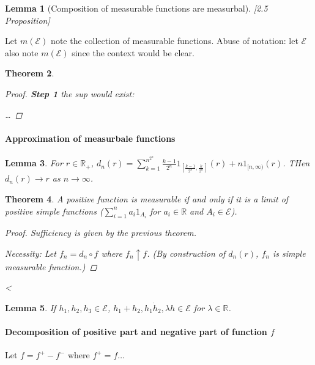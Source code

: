 \documentclass[11pt]{article}
\newcommand{\R}{{\mathbb R}}
\newtheorem{theorem}{Theorem}[subsection]
\newtheorem{lemma}[theorem]{Lemma}
\begin{document}
\begin{lemma}[Composition of measurable functions are measurbal]
  [2.5 Proposition]
\end{lemma}

Let $m(\mathcal E)$ note the collection of measurable functions. Abuse of
notation: let $\mathcal E$ also note $m(\mathcal E)$ since the context would be
clear.


\begin{theorem}
  
  \label{thm:something}
  \begin{proof}
    \textbf{Step 1} the sup would exist: 

    \dots

  \end{proof}
\end{theorem}

\paragraph{Approximation of measurbale functions}
\begin{lemma}
  For $r\in \R_+$,
  $d_n(r) = \sum _{k=1}^{n^{2^n}} \frac{k-1}{2^n} 1_{[\frac{k-1}{2^n},
  \frac{k}{2^n}]}(r) + n 1_{[n, \infty)}(r)$. THen $d_n(r) \to r$ as
    $n\to\infty$.
  \label{lemma:}
\end{lemma}

\begin{theorem}
  A positive function is measurable if and only if it is a limit of positive
  simple functions ($\sum_{i=1}^n a_i 1_{A_i} $ for $ a_i \in \R$ and $A_i \in
  \mathcal E$).
  \begin{proof}
    Sufficiency is given by the previous theorem. 

    Necessity: Let $f_n= d_n \circ f$ where $f_n \uparrow f$. (By construction
    of $d_n(r)$, $f_n$ is simple measurable function.)
    
  \end{proof}<
\end{theorem}

\begin{lemma}
  If $h_1, h_2, h_3 \in \mathcal E$, $h_1 + h_2, h_1 \dot h_2, \lambda h \in
  \mathcal E$ for $\lambda \in \R$.
  \label{Homework_01}
\end{lemma}

\paragraph{Decomposition of positive part and negative part of function $f$}
Let $f = f^+ - f^-$ where $f^+ = f \dots$ 
\end{document}
